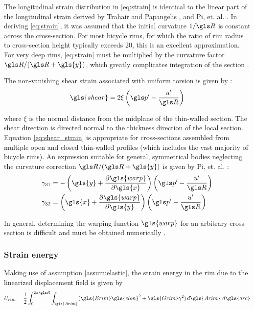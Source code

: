 \documentclass[\rootdir/thesis.tex]{subfiles}
\begin{document}
The longitudinal strain distribution in \eqref{eq:strain} is identical to the linear part of the longitudinal strain derived by Trahair and Papangelis \cite{Trahair1987}, and Pi, et. al. \cite{Pi1995}. In deriving \eqref{eq:strain}, it was assumed that the initial curvature $1/\R$ is constant across the cross-section. For most bicycle rims, for which the ratio of rim radius to cross-section height typically exceeds 20, this is an excellent approximation. For very deep rims, \eqref{eq:strain} must be multiplied by the curvature factor $\R/(\R+\gls{y})$, which greatly complicates integration of the section \cite{Kang1994,Lim2004,Ryu2012}.

The non-vanishing shear strain associated with uniform torsion is given by \cite{Pi1995,Kang1994}:
\begin{equation}
\label{eq:shear_strain}
\gls{shear} = 2 \xi \left(\p' - \frac{u'}{\R}\right)
\end{equation}

where $\xi$ is the normal distance from the midplane of the thin-walled section. The shear direction is directed normal to the thickness direction of the local section. Equation \eqref{eq:shear_strain} is appropriate for cross-sections assembled from multiple open and closed thin-walled profiles (which includes the vast majority of bicycle rims). An expression suitable for general, symmetrical bodies neglecting the curvature correction $\R/(\R+\gls{y})$ is given by Pi, et. al. \cite{Bradford2006b}:
\begin{subequations}
\begin{align}
\gamma_{31} &= -\left(\gls{y} + \frac{\partial \gls{warp}}{\partial \gls{x}}\right)\left(\p' - \frac{u'}{\R}\right)\\
\gamma_{32} &= \left(\gls{x} + \frac{\partial \gls{warp}}{\partial \gls{y}}\right)\left(\p' - \frac{u'}{\R}\right)
\end{align}
\end{subequations}

In general, determining the warping function $\gls{warp}$ for an arbitrary cross-section is difficult and must be obtained numerically \cite{Timoshenko1961}.


\subsubsection{Strain energy}
Making use of assumption \ref{assum:elastic}, the strain energy in the rim due to the linearized displacement field is given by
\begin{equation}
\label{eq:U_rim_gen}
U_{rim} = \frac{1}{2}\int_0^{2\pi \R} \int_{\gls{Arim}} (\gls{Erim}\gls{elon}^2 + \gls{Grim}\gamma^2) \,d\gls{Arim}\,\, d\gls{arc}
\end{equation}
\end{document}
